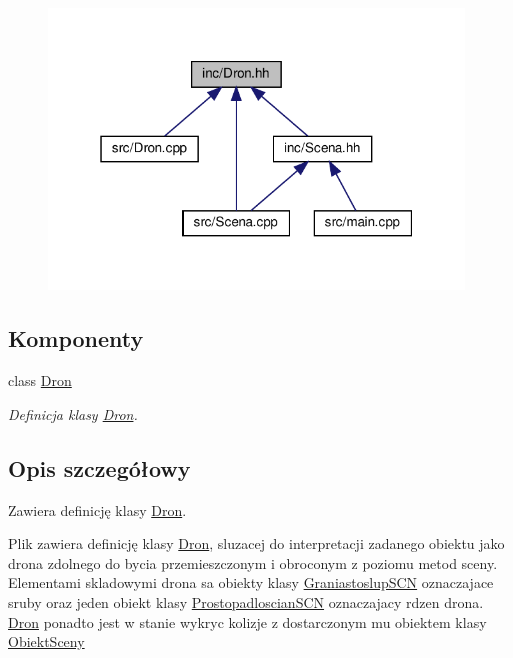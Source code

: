 \begin{figure}[H]
\begin{center}
\leavevmode
\includegraphics[width=313pt]{Dron_8hh__dep__incl}
\end{center}
\end{figure}
\subsection*{Komponenty}
\begin{DoxyCompactItemize}
\item 
class \hyperlink{classDron}{Dron}
\begin{DoxyCompactList}\small\item\em Definicja klasy \hyperlink{classDron}{Dron}. \end{DoxyCompactList}\end{DoxyCompactItemize}


\subsection{Opis szczegółowy}
Zawiera definicję klasy \hyperlink{classDron}{Dron}. 

Plik zawiera definicję klasy \hyperlink{classDron}{Dron}, sluzacej do interpretacji zadanego obiektu jako drona zdolnego do bycia przemieszczonym i obroconym z poziomu metod sceny. Elementami skladowymi drona sa obiekty klasy \hyperlink{classGraniastoslupSCN}{Graniastoslup\+S\+CN} oznaczajace sruby oraz jeden obiekt klasy \hyperlink{classProstopadloscianSCN}{Prostopadloscian\+S\+CN} oznaczajacy rdzen drona. \hyperlink{classDron}{Dron} ponadto jest w stanie wykryc kolizje z dostarczonym mu obiektem klasy \hyperlink{classObiektSceny}{Obiekt\+Sceny} 